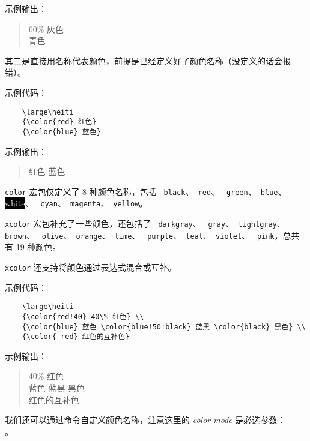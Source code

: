 \documentclass[UTF8]{ctexart}
\begin{document}
示例输出：
\begin{quote}
    \large\heiti
    {\color[gray]{0.6} 60\% 灰色} \\
    {\color[rgb]{0, 1, 1} 青色}
\end{quote}

其二是直接用名称代表颜色，前提是已经定义好了颜色名称（没定义的话会报错）。

示例代码：
\begin{verbatim}
    \large\heiti
    {\color{red} 红色}
    {\color{blue} 蓝色}
\end{verbatim}

示例输出：
\begin{quote}
    \large\heiti
    {\color{red} 红色}
    {\color{blue} 蓝色}
\end{quote}

\texttt{color} 宏包仅定义了 8 种颜色名称，包括 \texttt{{\color{black} black}}、\texttt{{\color{red} red}}、
\texttt{{\color{green} green}}、\texttt{{\color{blue} blue}}、\colorbox{black}{\textcolor{white}{white}}、
\texttt{{\color{cyan} cyan}}、\texttt{{\color{magenta} magenta}}、\texttt{{\color{yellow} yellow}}。

\texttt{xcolor} 宏包补充了一些颜色，还包括了 \texttt{{\color{darkgray} darkgray}}、
\texttt{{\color{gray} gray}}、\texttt{{\color{lightgray} lightgray}}、\texttt{{\color{brown} brown}}、
\texttt{{\color{olive} olive}}、\texttt{{\color{orange} orange}}、\texttt{{\color{lime} lime}}、
\texttt{{\color{purple} purple}}、\texttt{{\color{teal} teal}}、\texttt{{\color{violet} violet}}、
\texttt{{\color{pink} pink}}，总共有 19 种颜色。

\texttt{xcolor} 还支持将颜色通过表达式混合或互补。

示例代码：
\begin{verbatim}
    \large\heiti
    {\color{red!40} 40\% 红色} \\
    {\color{blue} 蓝色 \color{blue!50!black} 蓝黑 \color{black} 黑色} \\
    {\color{-red} 红色的互补色}
\end{verbatim}

示例输出：
\begin{quote}
    \large\heiti
    {\color{red!40} 40\% 红色} \\
    {\color{blue} 蓝色 \color{blue!50!black} 蓝黑 \color{black} 黑色} \\
    {\color{-red} 红色的互补色}
\end{quote}

我们还可以通过命令自定义颜色名称，注意这里的 \emph{color-mode} 是必选参数：\\
\texttt{}。
\end{document}
